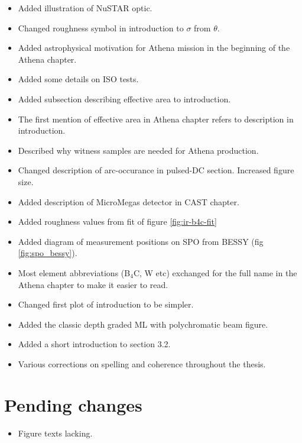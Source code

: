 \begin{itemize}
  \item Added illustration of NuSTAR optic.
  \item Changed roughness symbol in introduction to $\sigma$ from $\theta$.
  \item Added astrophysical motivation for Athena mission in the beginning of the Athena chapter.
  \item Added some details on ISO tests.
  \item Added subsection describing effective area to introduction.
  \item The first mention of effective area in Athena chapter refers to description in introduction.
  \item Described why witness samples are needed for Athena production.
  \item Changed description of arc-occurance in pulsed-DC section. Increased figure size.
  \item Added description of MicroMegas detector in CAST chapter.
  \item Added roughness values from fit of figure \ref{fig:ir-b4c-fit}
  \item Added diagram of measurement positions on SPO from BESSY (fig \ref{fig:spo_bessy}).
  \item Most element abbreviations (B$_4$C, W etc) exchanged for the full name in the Athena chapter to make it easier to read.
  \item Changed first plot of introduction to be simpler.
  \item Added the classic depth graded ML with polychromatic beam figure.
  \item Added a short introduction to section 3.2.

  \item Various corrections on spelling and coherence throughout the thesis.
\end{itemize}

\section{Pending changes}
\begin{itemize}
\item Figure texts lacking.
\end{itemize}
